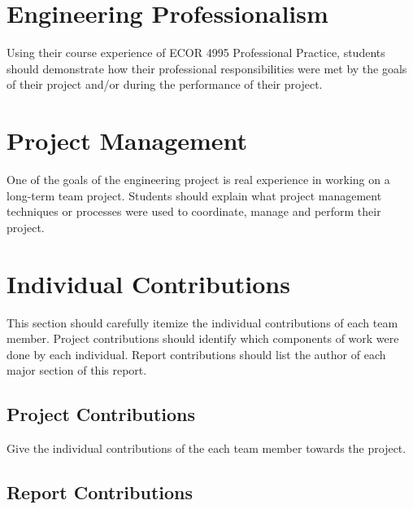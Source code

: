 \documentclass[12pt]{report}
\begin{document}

\section{Engineering Professionalism}

Using their course experience of ECOR 4995 Professional Practice, students should demonstrate how their professional responsibilities were met by the goals of their project and/or during the performance of their project. 


\section{Project Management}

One of the goals of the engineering project is real experience in working on a long-term team project.  Students should explain what project management techniques or processes were used to coordinate, manage and perform their project.


\section{Individual Contributions}

This section should carefully itemize the individual contributions of each team member. Project contributions should identify which components of work were done by each individual.  Report contributions should list the author of each major section of this report.


\subsection{Project Contributions}

Give the individual contributions of the each team member towards the project.


\subsection{Report Contributions}
\end{document}
